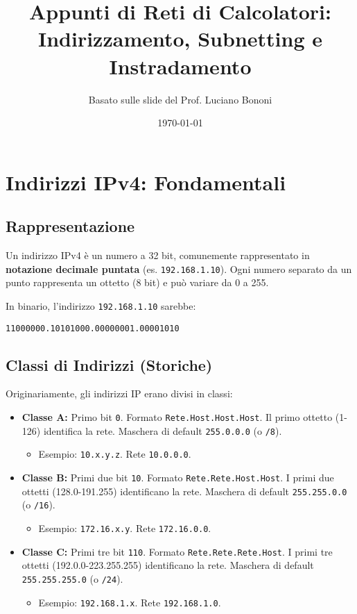 \documentclass{article}
\title{Appunti di Reti di Calcolatori: Indirizzamento, Subnetting e Instradamento}
\author{Basato sulle slide del Prof. Luciano Bononi}
\date{\today}
\begin{document}
\maketitle
\tableofcontents
\newpage

\section{Indirizzi IPv4: Fondamentali}

\subsection{Rappresentazione}
Un indirizzo IPv4 è un numero a 32 bit, comunemente rappresentato in \textbf{notazione decimale puntata} (es. \texttt{192.168.1.10}). Ogni numero separato da un punto rappresenta un ottetto (8 bit) e può variare da 0 a 255.

In binario, l'indirizzo \texttt{192.168.1.10} sarebbe:
\begin{verbatim}
11000000.10101000.00000001.00001010
\end{verbatim}

\subsection{Classi di Indirizzi (Storiche)}
Originariamente, gli indirizzi IP erano divisi in classi:
\begin{itemize}
    \item \textbf{Classe A:} Primo bit \texttt{0}. Formato \texttt{Rete.Host.Host.Host}. Il primo ottetto (1-126) identifica la rete. Maschera di default \texttt{255.0.0.0} (o \texttt{/8}).
    \begin{itemize}
        \item Esempio: \texttt{10.x.y.z}. Rete \texttt{10.0.0.0}.
    \end{itemize}
    \item \textbf{Classe B:} Primi due bit \texttt{10}. Formato \texttt{Rete.Rete.Host.Host}. I primi due ottetti (128.0-191.255) identificano la rete. Maschera di default \texttt{255.255.0.0} (o \texttt{/16}).
    \begin{itemize}
        \item Esempio: \texttt{172.16.x.y}. Rete \texttt{172.16.0.0}.
    \end{itemize}
    \item \textbf{Classe C:} Primi tre bit \texttt{110}. Formato \texttt{Rete.Rete.Rete.Host}. I primi tre ottetti (192.0.0-223.255.255) identificano la rete. Maschera di default \texttt{255.255.255.0} (o \texttt{/24}).
    \begin{itemize}
        \item Esempio: \texttt{192.168.1.x}. Rete \texttt{192.168.1.0}.
    \end{itemize}
\end{itemize}
\end{document}
